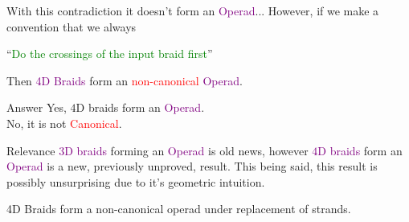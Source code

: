 \documentclass[14pt, xcolor=svgnames]{beamer}
\newcommand{\Green}[1]{\textcolor{Green}{#1}}
\newcommand{\Purple}[1]{\textcolor{Purple}{#1}}
\begin{document}
\begin{frame}
    With this contradiction it doesn't form an \Purple{Operad}...
    \pause
    However, if we make a convention that we always \\
    \begin{center}
        ``\Green{Do the crossings of the input braid first}'' \\
    \end{center}
    Then \Purple{4D Braids} form an \textcolor{Red}{non-canonical} \Purple{Operad}. 
\end{frame}

\begin{frame}
    \begin{block}{Answer}
        Yes, \( 4 \)D braids form an \Purple{Operad}. \\
        No, it is not \textcolor{Red}{Canonical}.
    \end{block}

    \begin{block}{Relevance}
        \Purple{ \( 3 \)D braids} forming an \Purple{Operad} is old news, however \Purple{\( 4 \)D braids} form an \Purple{Operad} is a new, previously unproved, result.
        This being said, this result is possibly unsurprising due to it's geometric intuition. 
    \end{block}

    \begin{theorem}
        4D Braids form a non-canonical operad under replacement of strands. 
    \end{theorem}
\end{frame}
\end{document}
